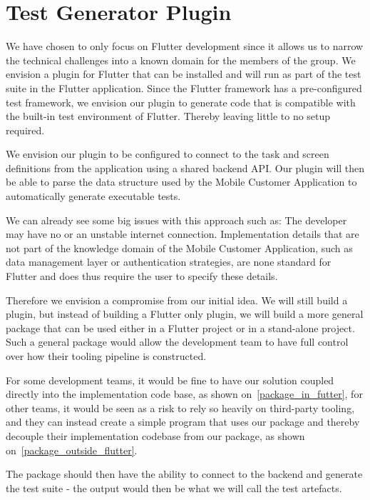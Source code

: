 \section{Test Generator Plugin}
We have chosen to only focus on Flutter development since it allows us to narrow the technical challenges into a known domain for the members of the group.
We envision a plugin for Flutter that can be installed and will run as part of the test suite in the Flutter application.
Since the Flutter framework has a pre-configured test framework, we envision our plugin to generate code that is compatible with the built-in test environment of Flutter.
Thereby leaving little to no setup required.

We envision our plugin to be configured to connect to the task and screen definitions from the application using a shared backend API.
Our plugin will then be able to parse the data structure used by the Mobile Customer Application to automatically generate executable tests.

We can already see some big issues with this approach such as:
The developer may have no or an unstable internet connection.
Implementation details that are not part of the knowledge domain of the Mobile Customer Application, such as data management layer or authentication strategies, are none standard for Flutter and does thus require the user to specify these details.


Therefore we envision a compromise from our initial idea. 
We will still build a plugin, but instead of building a Flutter only plugin, we will build a more general package that can be used either in a Flutter project or in a stand-alone project.
Such a general package would allow the development team to have full control over how their tooling pipeline is constructed.

For some development teams, it would be fine to have our solution coupled directly into the implementation code base, as shown on~\autoref{package_in_futter}, for other teams, it would be seen as a risk to rely so heavily on third-party tooling, and they can instead create a simple program that uses our package and thereby decouple their implementation codebase from our package, as shown on~\autoref{package_outside_flutter}. 

The package should then have the ability to connect to the backend and generate the test suite - the output would then be what we will call the test artefacts.

